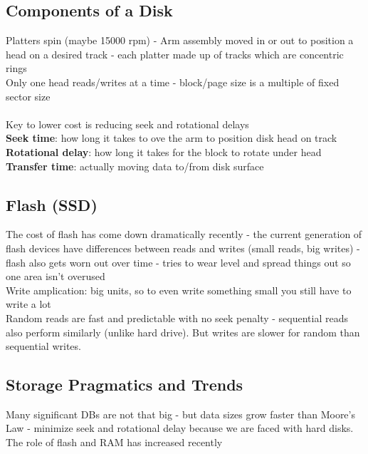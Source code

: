 \documentclass{article}
\begin{document}
\subsection{Components of a Disk}
Platters spin (maybe 15000 rpm) - Arm assembly moved in or out to position a head on a desired track - each platter made up of tracks which are concentric rings \\ 
Only one head reads/writes at a time - block/page size is a multiple of fixed sector size \\ \\ 
Key to lower cost is reducing seek and rotational delays \\ 
\textbf{Seek time}: how long it takes to ove the arm to position disk head on track \\ 
\textbf{Rotational delay}: how long it takes for the block to rotate under head \\ 
\textbf{Transfer time}: actually moving data to/from disk surface \\ 
\subsection{Flash (SSD)}
The cost of flash has come down dramatically recently - the current generation of flash devices have differences between reads and writes (small reads, big writes) - flash also gets worn out over time - tries to wear level and spread things out so one area isn't overused \\ 
Write amplication: big units, so to even write something small you still have to write a lot \\ 
Random reads are fast and predictable with no seek penalty - sequential reads also perform similarly (unlike hard drive). But writes are slower for random than sequential writes.
\subsection{Storage Pragmatics and Trends}
Many significant DBs are not that big - but data sizes grow faster than Moore's Law - minimize seek and rotational delay because we are faced with hard disks. The role of flash and RAM has increased recently
\end{document}
